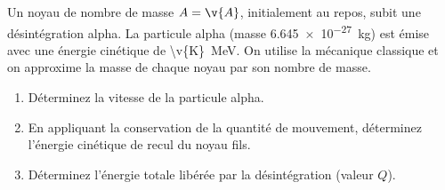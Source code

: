 Un noyau de nombre de masse $A = \v{A}$, initialement au repos, subit une désintégration alpha. La particule alpha (masse \qty{6.645e-27}{kg}) est émise avec une énergie cinétique de \qty{\v{K}}{MeV}. On utilise la mécanique classique et on approxime la masse de chaque noyau par son nombre de masse.

\begin{enumerate}[label=\alph*)]
    \item Déterminez la vitesse de la particule alpha.
    \item En appliquant la conservation de la quantité de mouvement, déterminez l'énergie cinétique de recul du noyau fils.
    \item Déterminez l'énergie totale libérée par la désintégration (valeur $Q$).
\end{enumerate}
